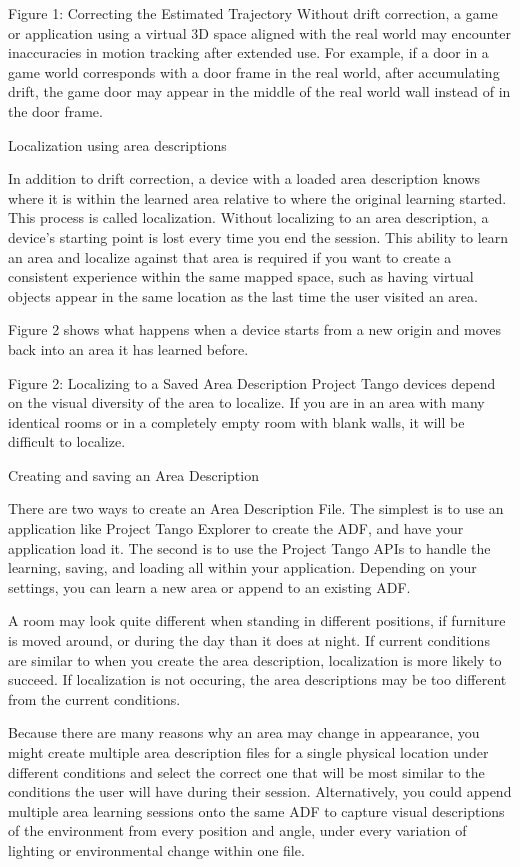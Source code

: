 Figure 1: Correcting the Estimated Trajectory
Without drift correction, a game or application using a virtual 3D space aligned with the real world may encounter inaccuracies in motion tracking after extended use. For example, if a door in a game world corresponds with a door frame in the real world, after accumulating drift, the game door may appear in the middle of the real world wall instead of in the door frame.

Localization using area descriptions

In addition to drift correction, a device with a loaded area description knows where it is within the learned area relative to where the original learning started. This process is called localization. Without localizing to an area description, a device's starting point is lost every time you end the session. This ability to learn an area and localize against that area is required if you want to create a consistent experience within the same mapped space, such as having virtual objects appear in the same location as the last time the user visited an area.

Figure 2 shows what happens when a device starts from a new origin and moves back into an area it has learned before.


Figure 2: Localizing to a Saved Area Description
Project Tango devices depend on the visual diversity of the area to localize. If you are in an area with many identical rooms or in a completely empty room with blank walls, it will be difficult to localize.

Creating and saving an Area Description

There are two ways to create an Area Description File. The simplest is to use an application like Project Tango Explorer to create the ADF, and have your application load it. The second is to use the Project Tango APIs to handle the learning, saving, and loading all within your application. Depending on your settings, you can learn a new area or append to an existing ADF.

A room may look quite different when standing in different positions, if furniture is moved around, or during the day than it does at night. If current conditions are similar to when you create the area description, localization is more likely to succeed. If localization is not occuring, the area descriptions may be too different from the current conditions.

Because there are many reasons why an area may change in appearance, you might create multiple area description files for a single physical location under different conditions and select the correct one that will be most similar to the conditions the user will have during their session. Alternatively, you could append multiple area learning sessions onto the same ADF to capture visual descriptions of the environment from every position and angle, under every variation of lighting or environmental change within one file.


